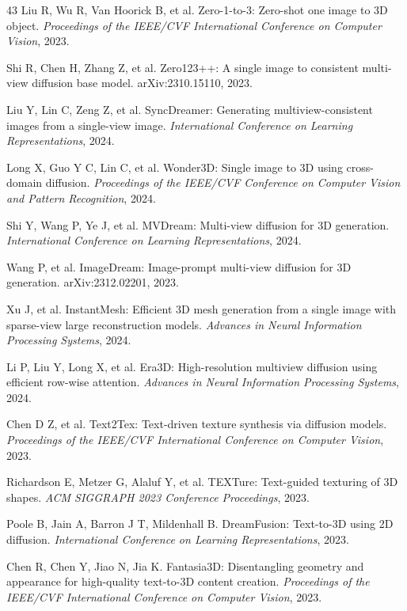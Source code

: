\documentclass[times,twocolumn,final]{elsarticle}
\begin{document}
\begin{thebibliography}{43}
Liu R, Wu R, Van Hoorick B, et al. Zero-1-to-3: Zero-shot one image to 3D object. \textit{Proceedings of the IEEE/CVF International Conference on Computer Vision}, 2023.

Shi R, Chen H, Zhang Z, et al. Zero123++: A single image to consistent multi-view diffusion base model. arXiv:2310.15110, 2023.

Liu Y, Lin C, Zeng Z, et al. SyncDreamer: Generating multiview-consistent images from a single-view image. \textit{International Conference on Learning Representations}, 2024.

Long X, Guo Y C, Lin C, et al. Wonder3D: Single image to 3D using cross-domain diffusion. \textit{Proceedings of the IEEE/CVF Conference on Computer Vision and Pattern Recognition}, 2024.

Shi Y, Wang P, Ye J, et al. MVDream: Multi-view diffusion for 3D generation. \textit{International Conference on Learning Representations}, 2024.

Wang P, et al. ImageDream: Image-prompt multi-view diffusion for 3D generation. arXiv:2312.02201, 2023.

Xu J, et al. InstantMesh: Efficient 3D mesh generation from a single image with sparse-view large reconstruction models. \textit{Advances in Neural Information Processing Systems}, 2024.

Li P, Liu Y, Long X, et al. Era3D: High-resolution multiview diffusion using efficient row-wise attention. \textit{Advances in Neural Information Processing Systems}, 2024.

Chen D Z, et al. Text2Tex: Text-driven texture synthesis via diffusion models. \textit{Proceedings of the IEEE/CVF International Conference on Computer Vision}, 2023.

Richardson E, Metzer G, Alaluf Y, et al. TEXTure: Text-guided texturing of 3D shapes. \textit{ACM SIGGRAPH 2023 Conference Proceedings}, 2023.

Poole B, Jain A, Barron J T, Mildenhall B. DreamFusion: Text-to-3D using 2D diffusion. \textit{International Conference on Learning Representations}, 2023.

Chen R, Chen Y, Jiao N, Jia K. Fantasia3D: Disentangling geometry and appearance for high-quality text-to-3D content creation. \textit{Proceedings of the IEEE/CVF International Conference on Computer Vision}, 2023.


\end{thebibliography}
\end{document}
